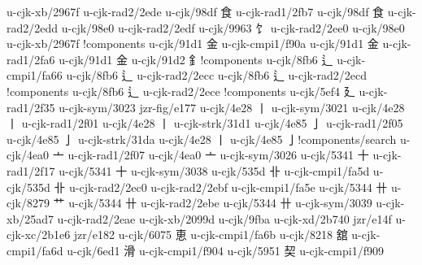 \begin{multicols}{2}
\begingroup\mktsStyleCode{}u-cjk-xb/2967f	{	}u-cjk-rad2/2ede	{} 
u-cjk/98df	{\cjk{}食}	u-cjk-rad1/2fb7	{} 
u-cjk/98df	{\cjk{}食}	u-cjk-rad2/2edd	{} 
u-cjk/98e0	{\cjk{}}	u-cjk-rad2/2edf	{} 
u-cjk/9963	{\cjk{}饣}	u-cjk-rad2/2ee0	{} 
u-cjk/98e0	{\cjk{}}	u-cjk-xb/2967f	{}!components 
u-cjk/91d1	{\cjk{}金}	u-cjk-cmpi1/f90a	{} 
u-cjk/91d1	{\cjk{}金}	u-cjk-rad1/2fa6	{} 
u-cjk/91d1	{\cjk{}金}	u-cjk/91d2	{\cjk{}釒}!components 
u-cjk/8fb6	{\cjk{}辶}	u-cjk-cmpi1/fa66	{} 
u-cjk/8fb6	{\cjk{}辶}	u-cjk-rad2/2ecc	{} 
u-cjk/8fb6	{\cjk{}辶}	u-cjk-rad2/2ecd	{}!components 
u-cjk/8fb6	{\cjk{}辶}	u-cjk-rad2/2ece	{}!components 
u-cjk/5ef4	{\cjk{}廴}	u-cjk-rad1/2f35	{} 
u-cjk-sym/3023	{\cjk{}}	jzr-fig/e177	{} 
u-cjk/4e28	{\cjk{}丨}	u-cjk-sym/3021	{} 
u-cjk/4e28	{\cjk{}丨}	u-cjk-rad1/2f01	{} 
u-cjk/4e28	{\cjk{}丨}	u-cjk-strk/31d1	{} 
u-cjk/4e85	{\cjk{}亅}	u-cjk-rad1/2f05	{} 
u-cjk/4e85	{\cjk{}亅}	u-cjk-strk/31da	{} 
u-cjk/4e28	{\cjk{}丨}	u-cjk/4e85	{\cjk{}亅}!components/search 
u-cjk/4ea0	{\cjk{}亠}	u-cjk-rad1/2f07	{} 
u-cjk/4ea0	{\cjk{}亠}	u-cjk-sym/3026	{} 
u-cjk/5341	{\cjk{}十}	u-cjk-rad1/2f17	{} 
u-cjk/5341	{\cjk{}十}	u-cjk-sym/3038	{} 
u-cjk/535d	{\cjk{}卝}	u-cjk-cmpi1/fa5d	{} 
u-cjk/535d	{\cjk{}卝}	u-cjk-rad2/2ec0	{} 
u-cjk-rad2/2ebf	{	}u-cjk-cmpi1/fa5e	{} 
u-cjk/5344	{\cjk{}卄}	u-cjk/8279	{\cjk{}艹} 
u-cjk/5344	{\cjk{}卄}	u-cjk-rad2/2ebe	{} 
u-cjk/5344	{\cjk{}卄}	u-cjk-sym/3039	{} 
u-cjk-xb/25ad7	{\cjk{}}	u-cjk-rad2/2eae	{} 
u-cjk-xb/2099d	{	}u-cjk/9fba	{\cjk{}} 
u-cjk-xd/2b740	{	}jzr/e14f	{} 
u-cjk-xc/2b1e6	{	}jzr/e182	{} 
u-cjk/6075	{\cjk{}恵}	u-cjk-cmpi1/fa6b	{} 
u-cjk/8218	{\cjk{}舘}	u-cjk-cmpi1/fa6d	{} 
u-cjk/6ed1	{\cjk{}滑}	u-cjk-cmpi1/f904	{} 
u-cjk/5951	{\cjk{}契}	u-cjk-cmpi1/f909	{} 

\end{multicols}
